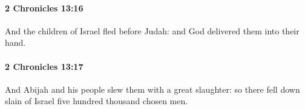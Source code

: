 		\paragraph{2 Chronicles 13:16} %
			\label{2CHRONICLES-13-16}

			And the children of Israel fled before Judah: and God delivered them into their hand.


		\paragraph{2 Chronicles 13:17} %
			\label{2CHRONICLES-13-17}

			And Abijah and his people slew them with a great slaughter: so there fell down slain of Israel five hundred thousand chosen men.


